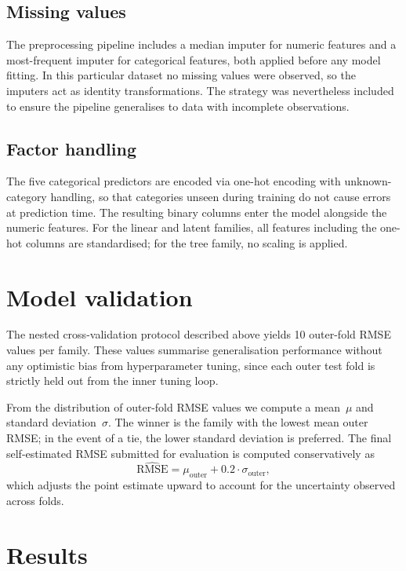 \documentclass{article}
\begin{document}
\subsection*{Missing values}

The preprocessing pipeline includes a median imputer for numeric features and a most-frequent imputer for categorical features, both applied before any model fitting. In this particular dataset no missing values were observed, so the imputers act as identity transformations. The strategy was nevertheless included to ensure the pipeline generalises to data with incomplete observations.

\subsection*{Factor handling}

The five categorical predictors are encoded via one-hot encoding with unknown-category handling, so that categories unseen during training do not cause errors at prediction time. The resulting binary columns enter the model alongside the numeric features. For the linear and latent families, all features including the one-hot columns are standardised; for the tree family, no scaling is applied.

\section*{Model validation}

The nested cross-validation protocol described above yields 10 outer-fold RMSE values per family. These values summarise generalisation performance without any optimistic bias from hyperparameter tuning, since each outer test fold is strictly held out from the inner tuning loop.

From the distribution of outer-fold RMSE values we compute a mean~$\mu$ and standard deviation~$\sigma$. The winner is the family with the lowest mean outer RMSE; in the event of a tie, the lower standard deviation is preferred. The final self-estimated RMSE submitted for evaluation is computed conservatively as
\[
  \widehat{\text{RMSE}} = \mu_{\text{outer}} + 0.2 \cdot \sigma_{\text{outer}},
\]
which adjusts the point estimate upward to account for the uncertainty observed across folds.

\section*{Results}
\end{document}
